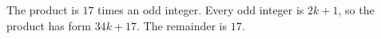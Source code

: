 The product is $17$ times an odd integer. Every odd integer is $2k+1$, so the product has form $34k+17$. The remainder is $\boxed{17}$.
